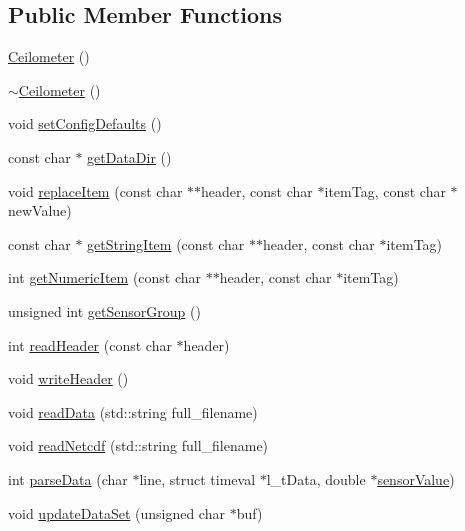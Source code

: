 \subsection*{Public Member Functions}
\begin{DoxyCompactItemize}
\item 
\hyperlink{classCeilometer_a2bf3db4a3f55c934412f83553f531f2b}{Ceilometer} ()
\item 
\hyperlink{classCeilometer_a449bdf7592f4630df99ab15bc885445b}{$\sim$\-Ceilometer} ()
\item 
void \hyperlink{classCeilometer_a9e1c96a6f8e813ac7490dfda84f9455b}{set\-Config\-Defaults} ()
\item 
const char $\ast$ \hyperlink{classCeilometer_ac9984aad78fe229d7314d45c0e722ef2}{get\-Data\-Dir} ()
\item 
void \hyperlink{classCeilometer_a50863be019de8c71409e73ffd1e83921}{replace\-Item} (const char $\ast$$\ast$header, const char $\ast$item\-Tag, const char $\ast$new\-Value)
\item 
const char $\ast$ \hyperlink{classCeilometer_a739c17f98b60c5cbcd3d65d6973dc22b}{get\-String\-Item} (const char $\ast$$\ast$header, const char $\ast$item\-Tag)
\item 
int \hyperlink{classCeilometer_ab35f4b64b941194185aee79ed3002456}{get\-Numeric\-Item} (const char $\ast$$\ast$header, const char $\ast$item\-Tag)
\item 
unsigned int \hyperlink{classCeilometer_a4acd8818fb18be80d3cc442d71934657}{get\-Sensor\-Group} ()
\item 
int \hyperlink{classCeilometer_ac915ac4f192b4e59d7cd40ed022a045d}{read\-Header} (const char $\ast$header)
\item 
void \hyperlink{classCeilometer_ab114fc34cce9cdb8ed87cad3aab908d0}{write\-Header} ()
\item 
void \hyperlink{classCeilometer_a9ef73907ba808f6f967b32dc3a161a66}{read\-Data} (std\-::string full\-\_\-filename)
\item 
void \hyperlink{classCeilometer_aeb9c0bddc60b920f7d686a7663b37eae}{read\-Netcdf} (std\-::string full\-\_\-filename)
\item 
int \hyperlink{classCeilometer_aaff1b4b73350c443e64df5decd975f07}{parse\-Data} (char $\ast$line, struct timeval $\ast$l\-\_\-t\-Data, double $\ast$\hyperlink{classDAQDevice_ad148188c57598fdf4fd4c1c333aeb0d8}{sensor\-Value})
\item 
void \hyperlink{classCeilometer_adcb425b5d5ffeb84a3603bab2a5ae6df}{update\-Data\-Set} (unsigned char $\ast$buf)
\end{DoxyCompactItemize}
